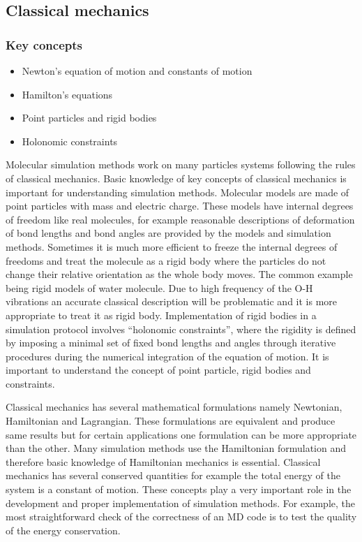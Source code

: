 \documentclass[9pt,bestpractices]{livecoms}
\begin{document}
\subsection{Classical mechanics}
\subsubsection{Key concepts}
\begin{itemize}
\item Newton’s equation of motion and constants of motion
\item Hamilton’s equations
\item Point particles and rigid bodies
\item Holonomic constraints
\end{itemize}

Molecular simulation methods work on many particles systems following the rules of classical mechanics. 
Basic knowledge of key concepts of classical mechanics is important for understanding simulation methods. 
Molecular models are made of point particles with mass and electric charge. 
These models have internal degrees of freedom like real molecules, for example reasonable descriptions of deformation of bond lengths and bond angles are provided by the models and simulation methods. 
Sometimes it is much more efficient to freeze the internal degrees of freedoms and treat the molecule as a rigid body where the particles do not change their relative orientation as the whole body moves. 
The common example being rigid models of water molecule. 
Due to high frequency of the O-H vibrations an accurate classical description will be problematic and it is more appropriate to treat it as rigid body. 
Implementation of rigid bodies in a simulation protocol involves ``holonomic constraints'', where the rigidity is defined by imposing a minimal set of fixed bond lengths and angles through iterative procedures during the numerical integration of the equation of motion. 
It is important to understand the concept of point particle, rigid bodies and constraints.

Classical mechanics has several mathematical formulations namely Newtonian, Hamiltonian and Lagrangian. 
These formulations are equivalent and produce same results but for certain applications one formulation can be more appropriate than the other. 
Many simulation methods use the Hamiltonian formulation and therefore basic knowledge of Hamiltonian mechanics is essential. 
Classical mechanics has several conserved quantities for example the total energy of the system is a constant of motion. 
These concepts play a very important role in the development and proper implementation of simulation methods. 
For example, the most straightforward check of the correctness of an MD code is to test the quality of the energy conservation.
\end{document}
